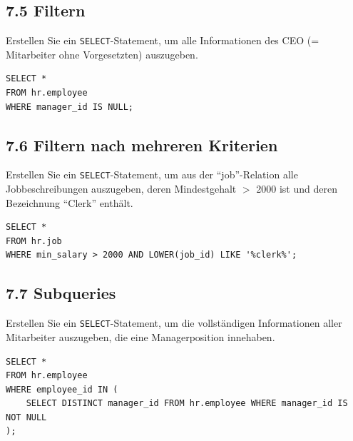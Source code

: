 \documentclass[11pt,a4paper]{article}
\begin{document}
\subsection*{7.5 \quad Filtern}
Erstellen Sie ein \texttt{SELECT}-Statement, um alle Informationen des CEO (= Mitarbeiter ohne Vorgesetzten) auszugeben.
\begin{loesung}
\begin{lstlisting}
SELECT *
FROM hr.employee
WHERE manager_id IS NULL;
\end{lstlisting}
\end{loesung}

\subsection*{7.6 \quad Filtern nach mehreren Kriterien}
Erstellen Sie ein \texttt{SELECT}-Statement, um aus der ``job''-Relation alle Jobbeschreibungen auszugeben, deren Mindestgehalt $>$ 2000 ist und deren Bezeichnung ``Clerk'' enth\"alt.
\begin{loesung}
\begin{lstlisting}
SELECT *
FROM hr.job
WHERE min_salary > 2000 AND LOWER(job_id) LIKE '%clerk%';
\end{lstlisting}
\end{loesung}

\subsection*{7.7 \quad Subqueries}
Erstellen Sie ein \texttt{SELECT}-Statement, um die vollst\"andigen Informationen aller Mitarbeiter auszugeben, die eine Managerposition innehaben.
\begin{loesung}
\begin{lstlisting}
SELECT *
FROM hr.employee
WHERE employee_id IN (
    SELECT DISTINCT manager_id FROM hr.employee WHERE manager_id IS NOT NULL
);
\end{lstlisting}
\end{loesung}
\end{document}
